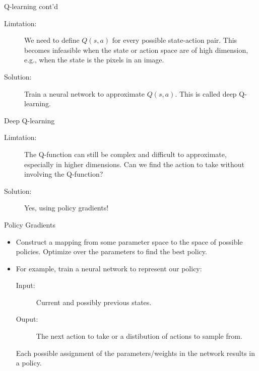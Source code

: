 \documentclass{beamer}
\begin{document}
\begin{frame}{Q-learning cont'd}
  \begin{description}
  \item[Limtation:] We need to define $Q(s,a)$ for every possible state-action pair. This becomes infeasible when the state or action space are of high dimension, e.g., when the state is the pixels in an image.
  \item[Solution:] Train a neural network to approximate $Q(s,a)$. This is called deep Q-learning.
  \end{description}
\end{frame}

\begin{frame}{Deep Q-learning}
  \begin{description}
  \item[Limtation:] The Q-function can still be complex and difficult to approximate, especially in higher dimensions. Can we find the action to take without involving the Q-function?
  \item[Solution:] Yes, using policy gradients!
  \end{description}
\end{frame}

\begin{frame}{Policy Gradients}
  \begin{itemize}
  \item Construct a mapping from some parameter space to the space of possible policies. Optimize over the parameters to find the best policy.
  \item For example, train a neural network to represent our policy:
  \begin{description}
  \item[Input:] Current and possibly previous states.
  \item[Ouput:] The next action to take or a distibution of actions to sample from.
  \end{description}
  Each possible assignment of the parameters/weights in the network results in a policy.
  \end{itemize}
\end{frame}
\end{document}
